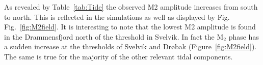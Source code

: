 As revealed by Table~\ref{tab:Tide} the observed M2 amplitude increases from south to north. This is reflected in the simulations as well as displayed by Fig. Fig.~\ref{fig:M2field}. It is interesting to note that the lowest M2 amplitude is found in the Drammensfjord north of the threshold in Svelvik. In fact the M$_2$ phase has a sudden increase at the thresholds of Svelvik and Dr{\o}bak (Figure~\ref{fig:M2field}). The same is true for the majority of the other relevant tidal components.


